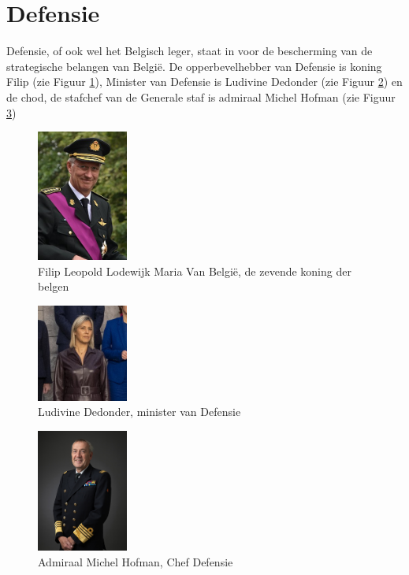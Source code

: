 
\section{Defensie}
\label{sec:defensie}

Defensie, of ook wel het Belgisch leger, staat in voor de bescherming van de strategische belangen van België. De opperbevelhebber van Defensie is koning Filip (zie Figuur \ref{fig:koning_filip}), Minister van Defensie is Ludivine Dedonder (zie Figuur \ref{fig:mod}) en de \gls{chod}, de stafchef van de Generale staf is admiraal Michel Hofman (zie Figuur \ref{fig:chod})~\autocite{Wikipedia2022a}

\begin{figure}
    \includegraphics[width=3cm]{img/koning_filip.jpg}
    \caption{\label{fig:koning_filip}Filip Leopold Lodewijk Maria Van België, de zevende koning der belgen~\autocite{Wikipedia2022}}
\end{figure}

\begin{figure}
    \includegraphics[width=3cm]{img/Ludivine_Dedonder.jpg}
    \caption{\label{fig:mod}Ludivine Dedonder, minister van Defensie~\autocite{Wikipedia2022c}}
\end{figure}

\begin{figure}
    \includegraphics[width=3cm]{img/michel_hofman.jpg}
    \caption{\label{fig:chod}Admiraal Michel Hofman, Chef Defensie~\autocite{Nato2020}}
\end{figure}

